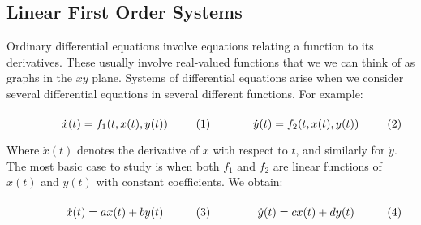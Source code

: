         \subsection{Linear First Order Systems}
            Ordinary differential equations involve equations
            relating a function to its derivatives. These
            usually involve real-valued functions that
            we we can think of as graphs in the $xy$ plane. 
            Systems of differential equations arise when we
            consider several differential equations in several
            different functions. For example:
            \par\hfill\par
            \vspace{-1ex}
            \begin{subequations}
                \begin{minipage}{0.49\textwidth}
                    \begin{equation}
                        \dot{x}(t)
                        =f_{1}(t,x(t),y(t))
                    \end{equation}
                \end{minipage}
                \hfill
                \begin{minipage}{0.49\textwidth}
                    \begin{equation}
                        \dot{y}(t)
                        =f_{2}(t,x(t),y(t))
                    \end{equation}
                \end{minipage}
            \end{subequations}
            \par\hfill\par
            Where $\dot{x}(t)$ denotes the derivative of $x$
            with respect to $t$, and similarly for $\dot{y}$.
            The most basic case to study is when both
            $f_{1}$ and $f_{2}$ are linear functions of
            $x(t)$ and $y(t)$ with constant coefficients.
            We obtain:
            \par\hfill\par
            \vspace{-1ex}
            \begin{subequations}
                \begin{minipage}{0.49\textwidth}
                    \begin{equation}
                        \label{diffeq:Simply_Linear_Coupled_Eq_1}
                        \dot{x}(t)
                        =ax(t)+by(t)
                    \end{equation}
                \end{minipage}
                \hfill
                \begin{minipage}{0.49\textwidth}
                    \begin{equation}
                        \label{diffeq:Simply_Linear_Coupled_Eq_2}
                        \dot{y}(t)
                        =cx(t)+dy(t)
                    \end{equation}
                \end{minipage}
            \end{subequations}
